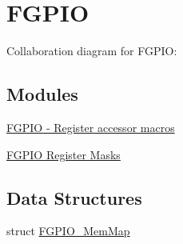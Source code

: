 \hypertarget{group___f_g_p_i_o___peripheral}{}\section{F\+G\+P\+IO}
\label{group___f_g_p_i_o___peripheral}
Collaboration diagram for F\+G\+P\+IO\+:
\subsection*{Modules}
\begin{DoxyCompactItemize}
\item 
\hyperlink{group___f_g_p_i_o___register___accessor___macros}{F\+G\+P\+I\+O -\/ Register accessor macros}
\item 
\hyperlink{group___f_g_p_i_o___register___masks}{F\+G\+P\+I\+O Register Masks}
\end{DoxyCompactItemize}
\subsection*{Data Structures}
\begin{DoxyCompactItemize}
\item 
struct \hyperlink{struct_f_g_p_i_o___mem_map}{F\+G\+P\+I\+O\+\_\+\+Mem\+Map}
\end{DoxyCompactItemize}
